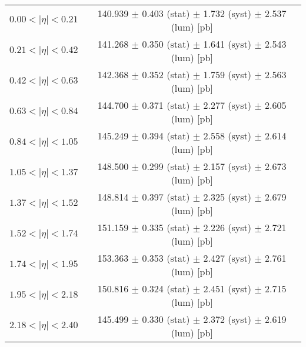 \begin{tabular}{lc}
\hline
$0.00 < |\eta| <0.21$          & 140.939 $\pm$ 0.403 (stat) $\pm$ 1.732 (syst) $\pm$ 2.537 (lum) [pb]  \\
$0.21 < |\eta| <0.42$          & 141.268 $\pm$ 0.350 (stat) $\pm$ 1.641 (syst) $\pm$ 2.543 (lum) [pb]  \\
$0.42 < |\eta| <0.63$          & 142.368 $\pm$ 0.352 (stat) $\pm$ 1.759 (syst) $\pm$ 2.563 (lum) [pb]  \\
$0.63 < |\eta| <0.84$          & 144.700 $\pm$ 0.371 (stat) $\pm$ 2.277 (syst) $\pm$ 2.605 (lum) [pb]  \\
$0.84 < |\eta| <1.05$          & 145.249 $\pm$ 0.394 (stat) $\pm$ 2.558 (syst) $\pm$ 2.614 (lum) [pb]  \\
$1.05 < |\eta| <1.37$          & 148.500 $\pm$ 0.299 (stat) $\pm$ 2.157 (syst) $\pm$ 2.673 (lum) [pb]  \\
$1.37 < |\eta| <1.52$          & 148.814 $\pm$ 0.397 (stat) $\pm$ 2.325 (syst) $\pm$ 2.679 (lum) [pb]  \\
$1.52 < |\eta| <1.74$          & 151.159 $\pm$ 0.335 (stat) $\pm$ 2.226 (syst) $\pm$ 2.721 (lum) [pb]  \\
$1.74 < |\eta| <1.95$          & 153.363 $\pm$ 0.353 (stat) $\pm$ 2.427 (syst) $\pm$ 2.761 (lum) [pb]  \\
$1.95 < |\eta| <2.18$          & 150.816 $\pm$ 0.324 (stat) $\pm$ 2.451 (syst) $\pm$ 2.715 (lum) [pb]  \\
$2.18 < |\eta| <2.40$          & 145.499 $\pm$ 0.330 (stat) $\pm$ 2.372 (syst) $\pm$ 2.619 (lum) [pb]  \\
\hline
\end{tabular}
